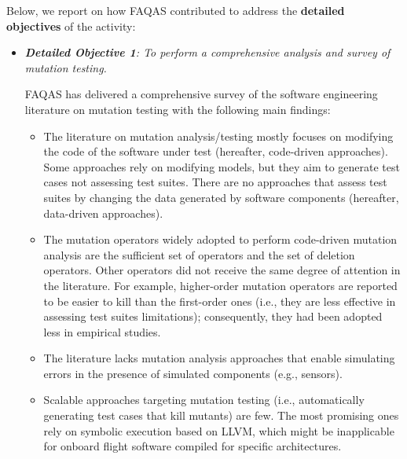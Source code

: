 Below, we report on how FAQAS contributed to address the \textbf{detailed objectives} of the activity:
\begin{itemize}
\item {\emph{\textbf{Detailed Objective 1}: To perform a comprehensive analysis and survey of mutation testing.}}

%

FAQAS has delivered a comprehensive survey of the software engineering literature on mutation testing with the following main findings:
\begin{itemize}
\item	The literature on mutation analysis/testing mostly focuses on modifying the code of the software under test (hereafter, code-driven approaches). Some approaches rely on modifying models, but they aim to generate test cases not assessing test suites. There are no approaches that assess test suites by changing the data generated by software components (hereafter, data-driven approaches).
\item The mutation operators widely adopted to perform code-driven mutation analysis are the sufficient set of operators and the set of deletion operators. Other operators did not receive the same degree of attention in the literature. For example, higher-order mutation operators are reported to be easier to kill than the first-order ones (i.e., they are less effective in assessing test suites limitations); consequently, they had been adopted less in empirical studies.                   
\item The literature lacks mutation analysis approaches that enable simulating errors in the presence of simulated components (e.g., sensors). 
\item Scalable approaches targeting mutation testing (i.e., automatically generating test cases that kill mutants) are few. The most promising ones rely on symbolic execution based on LLVM, which might be inapplicable for onboard flight software compiled for specific architectures. 
\end{itemize}


\end{itemize}
